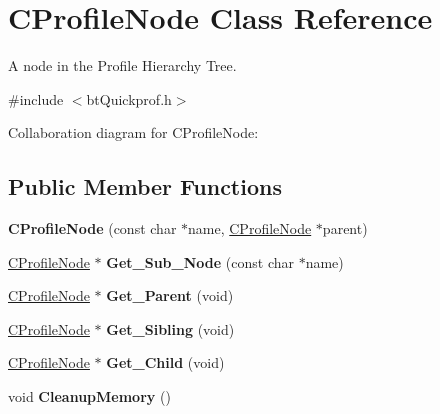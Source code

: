 \hypertarget{class_c_profile_node}{\section{C\+Profile\+Node Class Reference}
\label{class_c_profile_node}
}


A node in the Profile Hierarchy Tree.  




{\ttfamily \#include $<$bt\+Quickprof.\+h$>$}



Collaboration diagram for C\+Profile\+Node\+:
\subsection*{Public Member Functions}
\begin{DoxyCompactItemize}
\item 
\hypertarget{class_c_profile_node_ab393ec70fb6ff1f0b840cafe0fe8e79d}{{\bfseries C\+Profile\+Node} (const char $\ast$name, \hyperlink{class_c_profile_node}{C\+Profile\+Node} $\ast$parent)}\label{class_c_profile_node_ab393ec70fb6ff1f0b840cafe0fe8e79d}

\item 
\hypertarget{class_c_profile_node_a584af056fe36ae010ecf7a7708eb0017}{\hyperlink{class_c_profile_node}{C\+Profile\+Node} $\ast$ {\bfseries Get\+\_\+\+Sub\+\_\+\+Node} (const char $\ast$name)}\label{class_c_profile_node_a584af056fe36ae010ecf7a7708eb0017}

\item 
\hypertarget{class_c_profile_node_afe335d3cf4c294f6a2bae4595c8ccda6}{\hyperlink{class_c_profile_node}{C\+Profile\+Node} $\ast$ {\bfseries Get\+\_\+\+Parent} (void)}\label{class_c_profile_node_afe335d3cf4c294f6a2bae4595c8ccda6}

\item 
\hypertarget{class_c_profile_node_aac31b3576cef057f06b2ff4e930f6d0c}{\hyperlink{class_c_profile_node}{C\+Profile\+Node} $\ast$ {\bfseries Get\+\_\+\+Sibling} (void)}\label{class_c_profile_node_aac31b3576cef057f06b2ff4e930f6d0c}

\item 
\hypertarget{class_c_profile_node_a171b7886d2db03dcc36201af90a70db3}{\hyperlink{class_c_profile_node}{C\+Profile\+Node} $\ast$ {\bfseries Get\+\_\+\+Child} (void)}\label{class_c_profile_node_a171b7886d2db03dcc36201af90a70db3}

\item 
\hypertarget{class_c_profile_node_ac27e3242dddce582f00c547a1902f98b}{void {\bfseries Cleanup\+Memory} ()}\label{class_c_profile_node_ac27e3242dddce582f00c547a1902f98b}


\end{DoxyCompactItemize}
